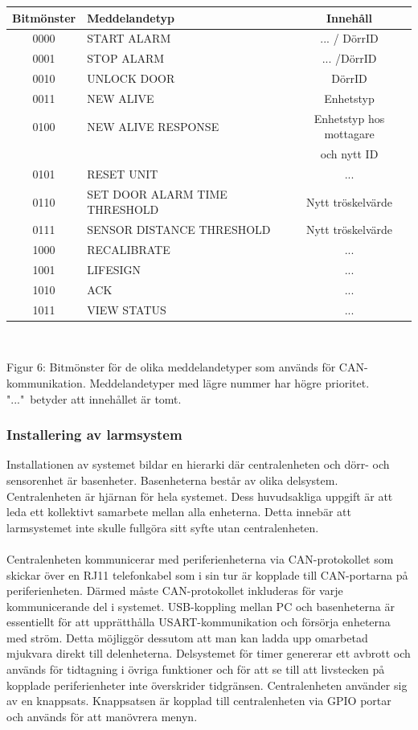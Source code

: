 \documentclass{article}
\begin{document}
\begin{tabular}{|c|l|c|}
    \hline
    Bitmönster & Meddelandetyp & Innehåll \\
    \hline
    0000 & START ALARM & ... / DörrID \\
    0001 & STOP ALARM & ... /DörrID \\
    0010 & UNLOCK DOOR & DörrID \\
    0011 & NEW ALIVE & Enhetstyp \\
    0100 & NEW ALIVE RESPONSE & Enhetstyp hos mottagare \\ 
    &&och nytt ID \\
    0101 & RESET UNIT & ... \\
    0110 & SET DOOR ALARM TIME THRESHOLD & Nytt tröskelvärde \\
    0111 & SENSOR DISTANCE THRESHOLD & Nytt tröskelvärde \\
    1000 & RECALIBRATE & ... \\
    1001 & LIFESIGN & ... \\
    1010 & ACK & ... \\
    1011 & VIEW STATUS & ... \\
    \hline
\end{tabular}
\\
\begin{center}
\caption{Figur 6: Bitmönster för de olika meddelandetyper som används för CAN-kommunikation. Meddelandetyper med lägre nummer har högre prioritet. "..."\ betyder att innehållet är tomt.}
\end{center}

\subsubsection{Installering av larmsystem}
Installationen av systemet bildar en hierarki där centralenheten och dörr- och sensorenhet är basenheter. 
Basenheterna består av olika delsystem. 
Centralenheten är hjärnan för hela systemet.
Dess huvudsakliga uppgift är att leda ett kollektivt samarbete mellan alla enheterna. 
Detta innebär att larmsystemet inte skulle fullgöra sitt syfte utan centralenheten.\\
\\
Centralenheten kommunicerar med periferienheterna via CAN-protokollet som skickar över en RJ11 telefonkabel som i sin tur är kopplade till CAN-portarna på periferienheten. 
Därmed måste CAN-protokollet inkluderas för varje kommunicerande del i systemet. 
USB-koppling mellan PC och basenheterna är essentiellt för att upprätthålla USART-kommunikation och försörja enheterna med ström. 
Detta möjliggör dessutom att man kan ladda upp omarbetad mjukvara direkt till delenheterna. 
Delsystemet för timer genererar ett avbrott och används för tidtagning i övriga funktioner och för att se till att livstecken på kopplade periferienheter inte överskrider tidgränsen. 
Centralenheten använder sig av en knappsats. 
Knappsatsen är kopplad till centralenheten via GPIO portar och används för att manövrera menyn.
\end{document}
